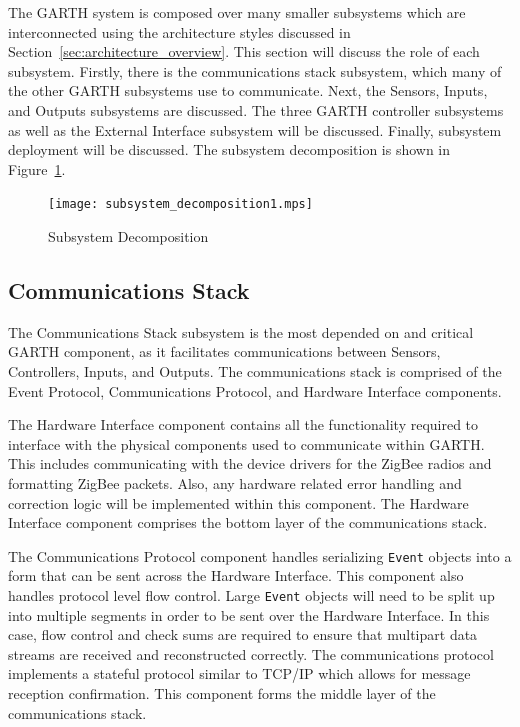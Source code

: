 \documentclass{report}
\begin{document}
The GARTH system is composed over many smaller subsystems which are
interconnected using the architecture styles discussed in
Section~\ref{sec:architecture_overview}. This section will discuss the
role of each subsystem. Firstly, there is the communications stack
subsystem, which many of the other GARTH subsystems use to
communicate. Next, the Sensors, Inputs, and Outputs subsystems are
discussed. The three GARTH controller subsystems as well as the
External Interface subsystem will be discussed. Finally, subsystem
deployment will be discussed. The subsystem decomposition is shown in
Figure~\ref{fig:subsystem_decomposition}.

\begin{figure}[hp]
    \centering
        \caption{Subsystem Decomposition}
        \scriptsize
        \setlength{\unitlength}{2.0em}
        \texttt{[image: subsystem\_decomposition1.mps]}
        \normalsize
    \label{fig:subsystem_decomposition}
\end{figure}

\subsection{Communications Stack}

The Communications Stack subsystem is the most depended on and critical
GARTH component, as it facilitates communications between Sensors,
Controllers, Inputs, and Outputs. The communications stack is
comprised of the Event Protocol, Communications Protocol, and Hardware
Interface components.

The Hardware Interface component contains all the
functionality required to interface with the physical components used
to communicate within GARTH. This includes communicating with the
device drivers for the ZigBee radios and formatting ZigBee packets.
Also, any hardware related error handling and correction logic will be
implemented within this component. The Hardware Interface component
comprises the bottom layer of the communications stack.

The Communications Protocol component handles serializing \texttt{Event}
objects into a form that can be sent across the Hardware
Interface. This component also handles protocol level flow
control. Large \texttt{Event} objects will need to be split up into multiple
segments in order to be sent over the Hardware Interface. In this
case, flow control and check sums are required to ensure that multipart
data streams are received and reconstructed correctly. The
communications protocol implements a stateful protocol similar to
TCP/IP which allows for message reception confirmation. This component
forms the middle layer of the communications stack.
\end{document}

